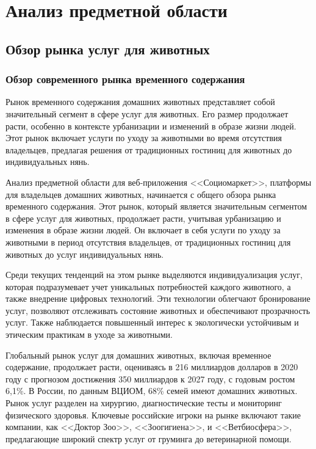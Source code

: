 \section{Анализ предметной области}

\subsection{Обзор рынка услуг для животных}

\subsubsection{Обзор современного рынка временного содержания}

Рынок временного содержания домашних животных представляет собой значительный сегмент в сфере услуг для животных. Его размер продолжает расти, особенно в контексте урбанизации и изменений в образе жизни людей. Этот рынок включает услуги по уходу за животными во время отсутствия владельцев, предлагая решения от традиционных гостиниц для животных до индивидуальных нянь.

Анализ предметной области для веб-приложения <<Социомаркет>>, платформы для владельцев домашних животных, начинается с общего обзора рынка временного содержания. Этот рынок, который является значительным сегментом в сфере услуг для животных, продолжает расти, учитывая урбанизацию и изменения в образе жизни людей. Он включает в себя услуги по уходу за животными в период отсутствия владельцев, от традиционных гостиниц для животных до услуг индивидуальных нянь.

Среди текущих тенденций на этом рынке выделяются индивидуализация услуг, которая подразумевает учет уникальных потребностей каждого животного, а также внедрение цифровых технологий. Эти технологии облегчают бронирование услуг, позволяют отслеживать состояние животных и обеспечивают прозрачность услуг. Также наблюдается повышенный интерес к экологически устойчивым и этическим практикам в уходе за животными.

Глобальный рынок услуг для домашних животных, включая временное содержание, продолжает расти, оцениваясь в 216 миллиардов долларов в 2020 году с прогнозом достижения 350 миллиардов к 2027 году, с годовым ростом 6,1\%​​. В России, по данным ВЦИОМ, 68\% семей имеют домашних животных. Рынок услуг разделен на хирургию, диагностические тесты и мониторинг физического здоровья​​. Ключевые российские игроки на рынке включают такие компании, как <<Доктор Зоо>>, <<Зоогигиена>>, и <<Ветбиосфера>>, предлагающие широкий спектр услуг от груминга до ветеринарной помощи.

